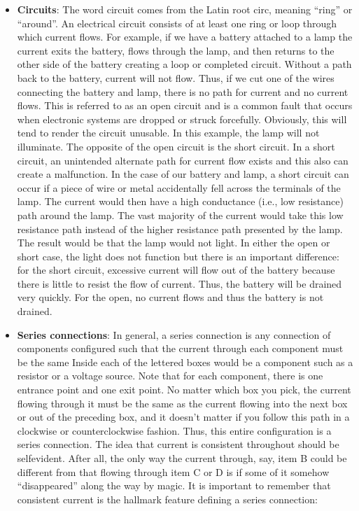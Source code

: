 \documentclass{report}
\begin{document}
\begin{itemize}
        \item \textbf{Circuits}: The word circuit comes from the Latin root circ, meaning “ring” or “around”. An electrical circuit consists of at least one ring or loop through which current flows. For example, if we have a battery attached to a lamp the current exits the battery, flows through the lamp, and then returns to the other side of the battery creating a loop or completed circuit. Without a path back to the battery, current will not flow. Thus, if we cut one of the wires connecting the battery and lamp, there is no path for current and no current flows. This is referred to as an open circuit and is a common fault that occurs when electronic systems are dropped or struck forcefully. Obviously, this will tend to render the circuit unusable. In this example, the lamp will not illuminate.
            \bigbreak \noindent 
            The opposite of the open circuit is the short circuit. In a short circuit, an unintended alternate path for current flow exists and this also can create a malfunction. In the case of our battery and lamp, a short circuit can occur if a piece of wire or metal accidentally fell across the terminals of the lamp. The current would then have a high conductance (i.e., low resistance) path around the lamp. The vast majority of the current would take this low resistance path instead of the higher resistance path presented by the lamp. The result would be that the lamp would not light. In either the open or short case, the light does not function but there is an important difference: for the short circuit, excessive current will flow out of the battery because there is little to resist the flow of current. Thus, the battery will be drained very quickly. For the open, no current flows and thus the battery is not drained.
        \item \textbf{Series connections}: In general, a series connection is any connection of components configured such that the current through each component must be the same
            \bigbreak \noindent 
            Inside each of the lettered boxes would be a component such as a resistor or a voltage source. Note that for each component, there is one entrance point and one exit point. No matter which box you pick, the current flowing through it must be the same as the current flowing into the next box or out of the preceding box, and it doesn't matter if you follow this path in a clockwise or counterclockwise fashion. Thus, this entire configuration is a series connection. The idea that current is consistent throughout should be selfevident. After all, the only way the current through, say, item B could be different from that flowing through item C or D is if some of it somehow “disappeared” along the way by magic. It is important to remember that consistent current is the hallmark feature defining a series connection:

\end{itemize}
\end{document}
